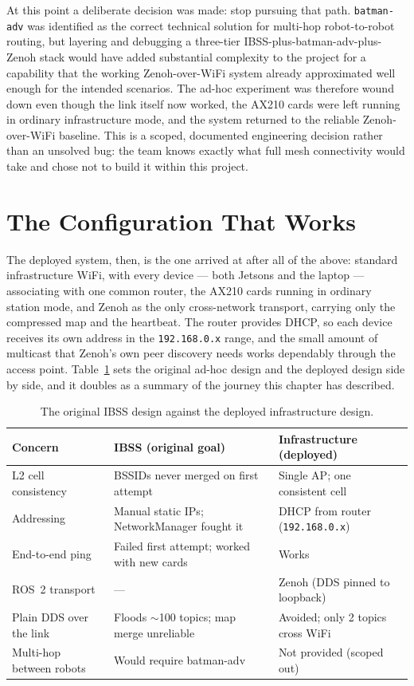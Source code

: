 At this point a deliberate decision was made: stop pursuing that path. \texttt{batman-adv} was identified as the correct technical solution for multi-hop robot-to-robot routing, but layering and debugging a three-tier IBSS-plus-batman-adv-plus-Zenoh stack would have added substantial complexity to the project for a capability that the working Zenoh-over-WiFi system already approximated well enough for the intended scenarios. The ad-hoc experiment was therefore wound down even though the link itself now worked, the AX210 cards were left running in ordinary infrastructure mode, and the system returned to the reliable Zenoh-over-WiFi baseline. This is a scoped, documented engineering decision rather than an unsolved bug: the team knows exactly what full mesh connectivity would take and chose not to build it within this project.

\section{The Configuration That Works}
\label{sec:final_arch}

The deployed system, then, is the one arrived at after all of the above: standard infrastructure WiFi, with every device --- both Jetsons and the laptop --- associating with one common router, the AX210 cards running in ordinary station mode, and Zenoh as the only cross-network transport, carrying only the compressed map and the heartbeat. The router provides DHCP, so each device receives its own address in the \texttt{192.168.0.x} range, and the small amount of multicast that Zenoh's own peer discovery needs works dependably through the access point. Table~\ref{tab:ibss_vs_infra} sets the original ad-hoc design and the deployed design side by side, and it doubles as a summary of the journey this chapter has described.

\begin{table}[H]
    \centering
    \caption{The original IBSS design against the deployed infrastructure design.}
    \label{tab:ibss_vs_infra}
    \begin{tabularx}{\textwidth}{@{}l X X@{}}
        \toprule
        \textbf{Concern} & \textbf{IBSS (original goal)} & \textbf{Infrastructure (deployed)} \\
        \midrule
        L2 cell consistency & BSSIDs never merged on first attempt & Single AP; one consistent cell \\
        Addressing & Manual static IPs; NetworkManager fought it & DHCP from router (\texttt{192.168.0.x}) \\
        End-to-end ping & Failed first attempt; worked with new cards & Works \\
        ROS~2 transport & --- & Zenoh (DDS pinned to loopback) \\
        Plain DDS over the link & Floods $\sim$100 topics; map merge unreliable & Avoided; only 2 topics cross WiFi \\
        Multi-hop between robots & Would require batman-adv & Not provided (scoped out) \\
        \bottomrule
    \end{tabularx}
\end{table}

